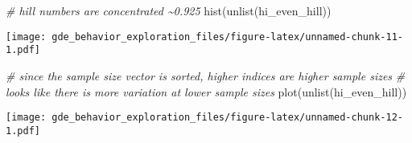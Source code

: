 \documentclass[
]{article}
\newenvironment{Shaded}{\begin{snugshade}}{\end{snugshade}}
\newcommand{\CommentTok}[1]{\textcolor[rgb]{0.56,0.35,0.01}{\textit{#1}}}
\newcommand{\FunctionTok}[1]{\textcolor[rgb]{0.00,0.00,0.00}{#1}}
\newcommand{\NormalTok}[1]{#1}
\begin{document}
\begin{Shaded}
\begin{Highlighting}[]
\CommentTok{\# hill numbers are concentrated \textasciitilde{}0.925}
\FunctionTok{hist}\NormalTok{(}\FunctionTok{unlist}\NormalTok{(hi\_even\_hill))}
\end{Highlighting}
\end{Shaded}

\texttt{[image: gde\_behavior\_exploration\_files/figure-latex/unnamed-chunk-11-1.pdf]}

\begin{Shaded}
\begin{Highlighting}[]
\CommentTok{\# since the sample size vector is sorted, higher indices are higher sample sizes}
\CommentTok{\# looks like there is more variation at lower sample sizes}
\FunctionTok{plot}\NormalTok{(}\FunctionTok{unlist}\NormalTok{(hi\_even\_hill))}
\end{Highlighting}
\end{Shaded}

\texttt{[image: gde\_behavior\_exploration\_files/figure-latex/unnamed-chunk-12-1.pdf]}
\end{document}
